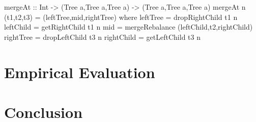 \documentclass[11pt,a4paper,oneside]{article}
\begin{document}
\begin{haskell}

mergeAt :: Int -> (Tree a,Tree a,Tree a) -> (Tree a,Tree a,Tree a)
mergeAt n (t1,t2,t3) = (leftTree,mid,rightTree)
                where leftTree   = dropRightChild t1 n
                      leftChild  = getRightChild t1 n
                      mid        = mergeRebalance (leftChild,t2,rightChild)
                      rightTree  = dropLeftChild t3 n
                      rightChild = getLeftChild t3 n

\end{haskell}

\section{Empirical Evaluation}

\section{Conclusion}



\end{document}
